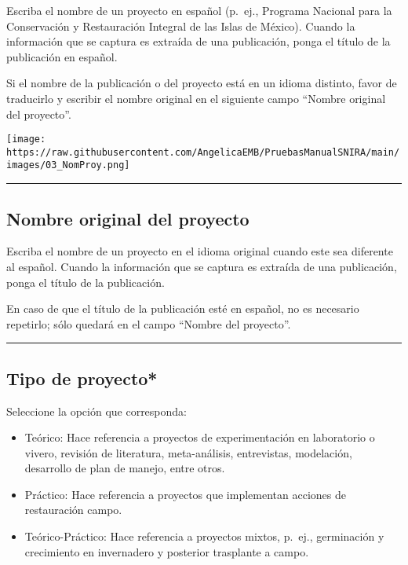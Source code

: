 \documentclass[
]{book}
\providecommand{\tightlist}{%
  \setlength{\itemsep}{0pt}\setlength{\parskip}{0pt}}
\begin{document}
Escriba el nombre de un proyecto en español (p.~ej., Programa Nacional para la Conservación y Restauración Integral de las Islas de México). Cuando la información que se captura es extraída de una publicación, ponga el título de la publicación en español.

Si el nombre de la publicación o del proyecto está en un idioma distinto, favor de traducirlo y escribir el nombre original en el siguiente campo ``Nombre original del proyecto''.

\texttt{[image: https://raw.githubusercontent.com/AngelicaEMB/PruebasManualSNIRA/main/images/03\_NomProy.png]}

\begin{center}\rule{0.5\linewidth}{0.5pt}\end{center}

\hypertarget{nombre-original-del-proyecto}{%
\subsection*{Nombre original del proyecto}\label{nombre-original-del-proyecto}}

Escriba el nombre de un proyecto en el idioma original cuando este sea diferente al español. Cuando la información que se captura es extraída de una publicación, ponga el título de la publicación.

En caso de que el título de la publicación esté en español, no es necesario repetirlo; sólo quedará en el campo ``Nombre del proyecto''.

\begin{center}\rule{0.5\linewidth}{0.5pt}\end{center}

\hypertarget{tipo-de-proyecto}{%
\subsection*{\texorpdfstring{{Tipo de proyecto*}}{Tipo de proyecto*}}\label{tipo-de-proyecto}}

Seleccione la opción que corresponda:

\begin{itemize}
\tightlist
\item
  Teórico: Hace referencia a proyectos de experimentación en laboratorio o vivero, revisión de literatura, meta-análisis, entrevistas, modelación, desarrollo de plan de manejo, entre otros.
\item
  Práctico: Hace referencia a proyectos que implementan acciones de restauración campo.
\item
  Teórico-Práctico: Hace referencia a proyectos mixtos, p.~ej., germinación y crecimiento en invernadero y posterior trasplante a campo.
\end{itemize}
\end{document}

